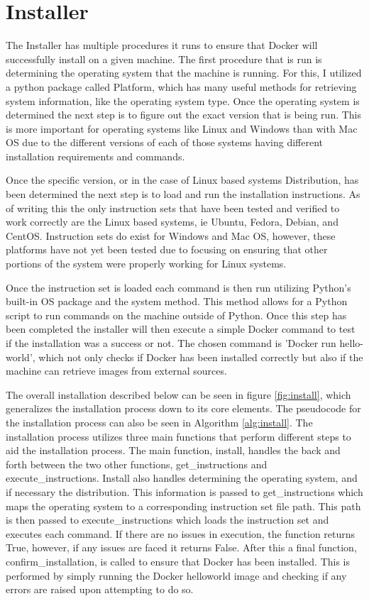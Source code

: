 \section{Installer}
\label{sec:installer}

The Installer has multiple procedures it runs to ensure that Docker will successfully install on a given machine. The first procedure that is run is determining the operating system that the machine is running. For this, I utilized a python package called Platform, which has many useful methods for retrieving system information, like the operating system type. Once the operating system is determined the next step is to figure out the exact version that is being run. This is more important for operating systems like Linux and Windows than with Mac OS due to the different versions of each of those systems having different installation requirements and commands.

Once the specific version, or in the case of Linux based systems Distribution, has been determined the next step is to load and run the installation instructions. As of writing this the only instruction sets that have been tested and verified to work correctly are the Linux based systems, ie Ubuntu, Fedora, Debian, and CentOS. Instruction sets do exist for Windows and Mac OS, however, these platforms have not yet been tested due to focusing on ensuring that other portions of the system were properly working for Linux systems.

Once the instruction set is loaded each command is then run utilizing Python's built-in OS package and the system method. This method allows for a Python script to run commands on the machine outside of Python. Once this step has been completed the installer will then execute a simple Docker command to test if the installation was a success or not. The chosen command is 'Docker run hello-world', which not only checks if Docker has been installed correctly but also if the machine can retrieve images from external sources.

The overall installation described below can be seen in figure \ref{fig:install}, which generalizes the installation process down to its core elements. The pseudocode for the installation process can also be seen in Algorithm \ref{alg:install}. The installation process utilizes three main functions that perform different steps to aid the installation process. The main function, install, handles the back and forth between the two other functions, get\_instructions and execute\_instructions. Install also handles determining the operating system, and if necessary the distribution. This information is passed to get\_instructions which maps the operating system to a corresponding instruction set file path. This path is then passed to execute\_instructions which loads the instruction set and executes each command. If there are no issues in execution, the function returns True, however, if any issues are faced it returns False. After this a final function, confirm\_installation, is called to ensure that Docker has been installed. This is performed by simply running the Docker hello\-world image and checking if any errors are raised upon attempting to do so.


